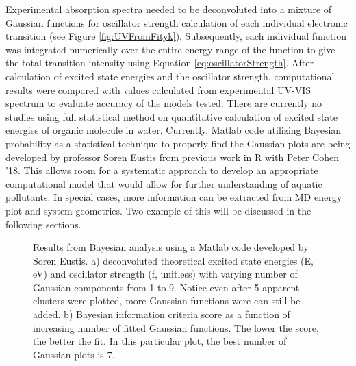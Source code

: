 \documentclass[
journal=jpcbfk, %
manuscript=article]{achemso}
\begin{document}
 Experimental  absorption spectra needed to be deconvoluted into a mixture of Gaussian functions for oscillator strength calculation of each individual electronic transition (see Figure \ref{fig:UVFromFityk}). Subsequently, each individual function was integrated numerically over the entire energy range of the function to give the total transition intensity using Equation \ref{eq:oscillatorStrength}. After calculation of excited state energies and the oscillator strength, computational results were compared with values calculated from experimental UV-VIS spectrum to evaluate accuracy of the models tested. There are currently no studies using full statistical method on quantitative calculation of excited state energies of organic molecule in water. Currently, Matlab code utilizing Bayesian probability as a statistical technique to properly find the Gaussian plots are being developed by professor Soren Eustis from previous work in R\cite{RDevelopmentCoreTeam2008} with Peter Cohen '18. This allows room for a systematic approach to develop an appropriate computational model that would allow for further understanding of aquatic pollutants. In special cases, more information can be extracted from MD energy plot and system geometries. Two example of this will be discussed in the following sections. 

\begin{figure}[!tbp]
	\centering
	\label{fig:aniline4}
	\begin{subfigure}[b]{0.49\textwidth}
		\caption{}
		\label{fig:bayesiana)}
	\end{subfigure}
	\hfill
	\begin{subfigure}[b]{0.49\textwidth}
		\caption{}
		\label{fig:bayesianb)}
	\end{subfigure}
	\caption{ Results from Bayesian analysis using a Matlab code developed by Soren Eustis. a) deconvoluted theoretical excited state energies (E, eV) and oscillator strength (f, unitless) with varying number of Gaussian components from 1 to 9. Notice even after 5 apparent clusters were plotted, more Gaussian functions were can still be added. b) Bayesian information criteria score as a function of increasing number of fitted Gaussian functions. The lower the score, the better the fit. In this particular plot, the best number of Gaussian plots is 7.}
\end{figure}
\end{document}
